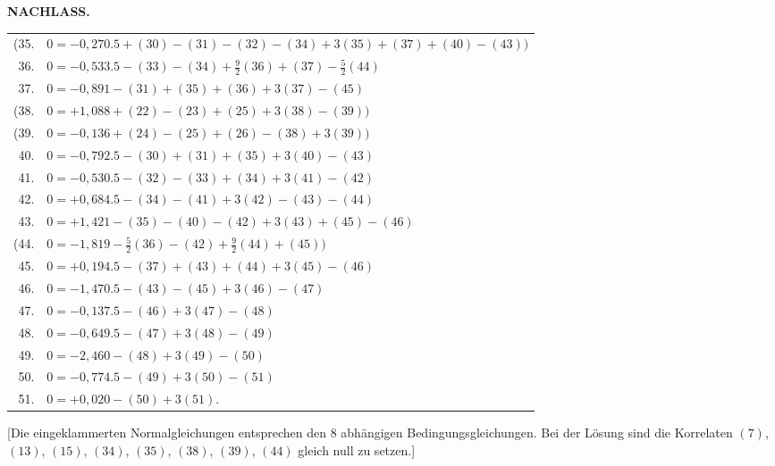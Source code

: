 \endgroup
\newpage
{}\hfill\textbf{NACHLASS.}
\begingroup
\renewcommand{\arraystretch}{1.16}
\begin{longtable}{@{}r@{\quad}l@{}}
(35.&$0=-0{,}270.5+(30)-(31)-(32)-(34)+3(35)+(37)+(40)-(43))$\\
36.&$0=-0{,}533.5-(33)-(34)+\frac92(36)+(37)-\frac52(44)$\\
37.&$0=-0{,}891-(31)+(35)+(36)+3(37)-(45)$\\
(38.&$0=+1{,}088+(22)-(23)+(25)+3(38)-(39))$\\
(39.&$0=-0{,}136+(24)-(25)+(26)-(38)+3(39))$\\
40.&$0=-0{,}792.5-(30)+(31)+(35)+3(40)-(43)$\\
41.&$0=-0{,}530.5-(32)-(33)+(34)+3(41)-(42)$\\
42.&$0=+0{,}684.5-(34)-(41)+3(42)-(43)-(44)$\\
43.&$0=+1{,}421-(35)-(40)-(42)+3(43)+(45)-(46)$\\
(44.&$0=-1{,}819-\frac52(36)-(42)+\frac92(44)+(45))$\\
45.&$0=+0{,}194.5-(37)+(43)+(44)+3(45)-(46)$\\
46.&$0=-1{,}470.5-(43)-(45)+3(46)-(47)$\\
47.&$0=-0{,}137.5-(46)+3(47)-(48)$\\
48.&$0=-0{,}649.5-(47)+3(48)-(49)$\\
49.&$0=-2{,}460-(48)+3(49)-(50)$\\
50.&$0=-0{,}774.5-(49)+3(50)-(51)$\\
51.&$0=+0{,}020-(50)+3(51).$\\
\end{longtable}
\endgroup

[Die eingeklammerten Normalgleichungen entsprechen den 8 abhängigen
Bedingungsgleichungen. Bei der Lösung sind die Korrelaten $(7)$, $(13)$, $(15)$,
$(34)$, $(35)$, $(38)$, $(39)$, $(44)$ gleich null zu setzen.]
